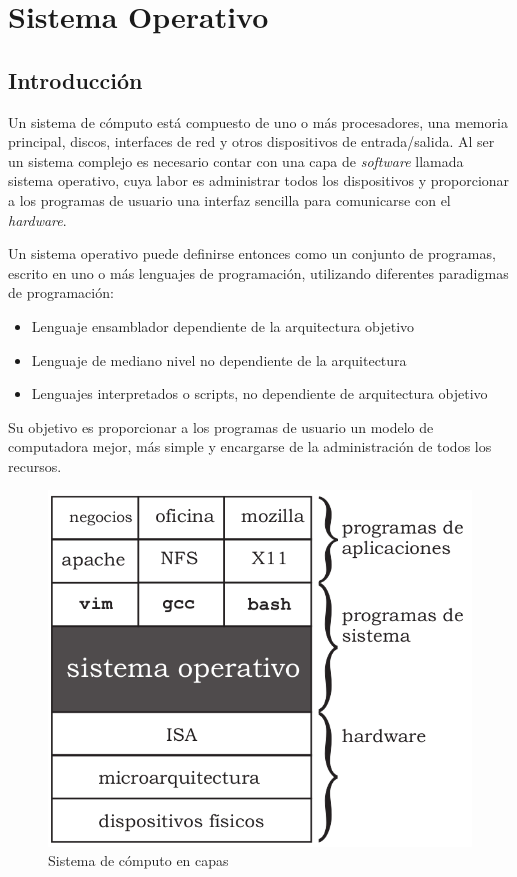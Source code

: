 \chapter{Sistema Operativo}

\section{Introducción}

Un sistema de cómputo está compuesto de uno o más procesadores, una memoria
principal, discos, interfaces de red y otros dispositivos de entrada/salida. Al
ser un sistema complejo es necesario contar con una capa de \emph{software}
llamada sistema operativo, cuya labor es administrar todos los dispositivos y
proporcionar a los programas de usuario una interfaz sencilla para comunicarse
con el \emph{hardware}\cite{tanenbaum}.

Un sistema operativo puede definirse entonces como un conjunto de programas,
escrito en uno o más lenguajes de programación, utilizando diferentes
paradigmas de programación:

\begin{itemize}

 \item Lenguaje ensamblador dependiente de la arquitectura objetivo
 \item Lenguaje de mediano nivel no dependiente de la arquitectura
 \item Lenguajes interpretados o scripts, no dependiente de arquitectura
  objetivo
 
\end{itemize}

Su objetivo es proporcionar a los programas de usuario un
modelo de computadora mejor, más simple y encargarse de la administración de
todos los recursos.

\begin{figure}[ht]
 \centering
 \includegraphics[scale=.50]{./figuras/capas.png}
 \caption{Sistema de cómputo en capas}
 \label{Sistema de cómputo en capas}
\end{figure}


